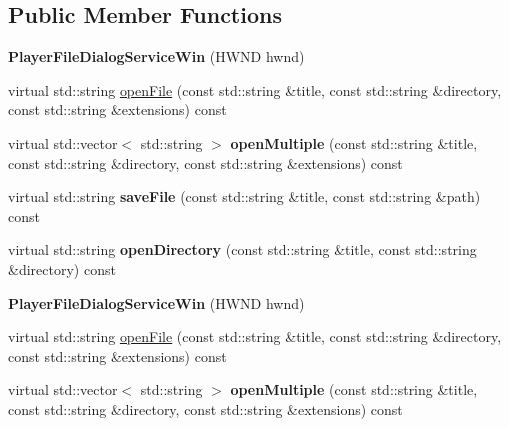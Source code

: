 \subsection*{Public Member Functions}
\begin{DoxyCompactItemize}
\item 
\mbox{\label{classPlayerFileDialogServiceWin_a2c76c67f83ee0df5b87e3e0c9eac3823}} 
{\bfseries Player\+File\+Dialog\+Service\+Win} (H\+W\+ND hwnd)
\item 
virtual std\+::string \hyperlink{classPlayerFileDialogServiceWin_a1766752253a53e3b0a2c612d915b4453}{open\+File} (const std\+::string \&title, const std\+::string \&directory, const std\+::string \&extensions) const
\item 
\mbox{\label{classPlayerFileDialogServiceWin_a9081ce446488e9744fd965a6ffefe8d7}} 
virtual std\+::vector$<$ std\+::string $>$ {\bfseries open\+Multiple} (const std\+::string \&title, const std\+::string \&directory, const std\+::string \&extensions) const
\item 
\mbox{\label{classPlayerFileDialogServiceWin_a62835e048c64b05bd9968c10e16ee9cb}} 
virtual std\+::string {\bfseries save\+File} (const std\+::string \&title, const std\+::string \&path) const
\item 
\mbox{\label{classPlayerFileDialogServiceWin_a82587bb65d0e802f8c4008d1af151f29}} 
virtual std\+::string {\bfseries open\+Directory} (const std\+::string \&title, const std\+::string \&directory) const
\item 
\mbox{\label{classPlayerFileDialogServiceWin_ac1bdae6ea427c3107094d57d38bcd3b3}} 
{\bfseries Player\+File\+Dialog\+Service\+Win} (H\+W\+ND hwnd)
\item 
virtual std\+::string \hyperlink{classPlayerFileDialogServiceWin_a110a061dc10c59cba4cb202316e970b4}{open\+File} (const std\+::string \&title, const std\+::string \&directory, const std\+::string \&extensions) const
\item 
\mbox{\label{classPlayerFileDialogServiceWin_a9d59155cc06586eef55c5ed8c8dede73}} 
virtual std\+::vector$<$ std\+::string $>$ {\bfseries open\+Multiple} (const std\+::string \&title, const std\+::string \&directory, const std\+::string \&extensions) const

\end{DoxyCompactItemize}
